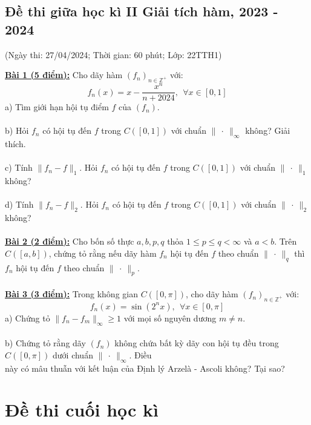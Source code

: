 \documentclass[10pt, a4paper]{article}
\begin{document}
\newpage

\subsection{Đề thi giữa học kì II Giải tích hàm, 2023 - 2024}
\begin{center}
	\color{blue}(Ngày thi: 27/04/2024; Thời gian: 60 phút; Lớp: 22TTH1)
\end{center}
\color{red}\underline{\textbf{Bài 1 (5 điểm):}} \color{black}Cho dãy hàm $(f_n)_{n\in\mathbb Z^+}$ với: $$f_n(x)=x-\dfrac{x^n}{n+2024},~~\forall x\in[0,1]$$
\color{red}a) \color{black}Tìm giới hạn hội tụ điểm $f$ của $(f_n)$.\\\\
\color{red}b) \color{black}Hỏi $f_n$ có hội tụ đến $f$ trong $C([0,1])$ với chuẩn $\lVert~\cdot~\rVert_\infty$ không? Giải thích.\\\\
\color{red}c) \color{black}Tính $\lVert f_n-f\rVert_1$. Hỏi $f_n$ có hội tụ đến $f$ trong $C([0,1])$ với chuẩn $\lVert~\cdot~\rVert_1$ không?\\\\
\color{red}d) \color{black}Tính $\lVert f_n-f\rVert_2$. Hỏi $f_n$ có hội tụ đến $f$ trong $C([0,1])$ với chuẩn $\lVert~\cdot~\rVert_2$ không?\\\\
\color{red}\underline{\textbf{Bài 2 (2 điểm):}} \color{black}Cho bốn số thực $a,b,p,q$ thỏa $1\le p\le q<\infty$ và $a<b$. Trên $C([a,b])$, chứng tỏ rằng nếu dãy hàm $f_n$ hội tụ đến $f$ theo chuẩn $\lVert~\cdot~\rVert_q$ thì $f_n$ hội tụ đến $f$ theo chuẩn $\lVert~\cdot~\rVert_p$.\\\\
\color{red}\underline{\textbf{Bài 3 (3 điểm):}} \color{black}Trong không gian $C([0,\pi])$, cho dãy hàm $(f_n)_{n\in\mathbb Z^+}$ với: $$f_n(x)=\sin(2^nx),~~\forall x\in[0,\pi]$$
\color{red}a) \color{black}Chứng tỏ $\lVert f_n-f_m\rVert_\infty\ge1$ với mọi số nguyên dương $m\ne n$.\\\\
\color{red}b) \color{black}Chứng tỏ rằng dãy $(f_n)$ không chứa bất kỳ dãy con hội tụ đều trong $C([0,\pi])$ dưới chuẩn $\lVert~\cdot~\rVert_\infty$. Điều\\ này có mâu thuẫn với kết luận của Định lý Arzelà - Ascoli không? Tại sao?
\newpage

\section{Đề thi cuối học kì}
\end{document}
